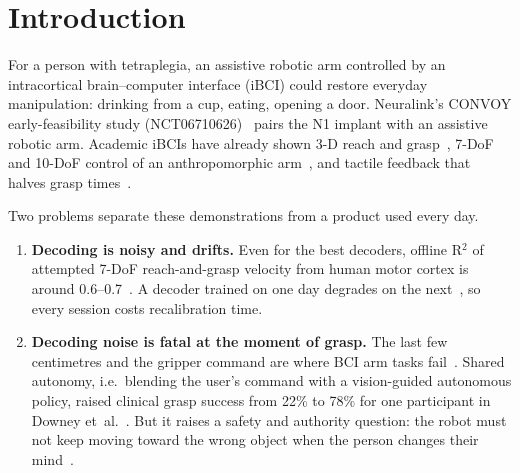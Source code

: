 \section{Introduction}
For a person with tetraplegia, an assistive robotic arm controlled by an intracortical
brain--computer interface (iBCI) could restore everyday manipulation: drinking from a
cup, eating, opening a door. Neuralink's CONVOY early-feasibility study
(NCT06710626)~\cite{neuralink2024convoy} pairs the N1 implant with an assistive robotic
arm. Academic iBCIs have already shown 3-D reach and grasp~\cite{hochberg2012reach},
7-DoF and 10-DoF control of an anthropomorphic arm~\cite{collinger2013high,wodlinger2015ten},
and tactile feedback that halves grasp times~\cite{flesher2021brain}.

Two problems separate these demonstrations from a product used every day.
\begin{enumerate}
\item \textbf{Decoding is noisy and drifts.} Even for the best decoders, offline R$^2$
  of attempted 7-DoF reach-and-grasp velocity from human motor cortex is around
  0.6--0.7~\cite{karpowicz2024falcon}. A decoder trained on one day degrades on the
  next~\cite{downey2018stability,jarosiewicz2015virtual,degenhart2020stabilization},
  so every session costs recalibration time.
\item \textbf{Decoding noise is fatal at the moment of grasp.} The last few centimetres
  and the gripper command are where BCI arm tasks fail~\cite{flesher2021brain,downey2016blending}.
  Shared autonomy, i.e.\ blending the user's command with a vision-guided autonomous
  policy, raised clinical grasp success from 22\% to 78\% for one participant in
  Downey et~al.~\cite{downey2016blending}. But it raises a safety and authority
  question: the robot must not keep moving toward the wrong object when the person
  changes their mind~\cite{dragan2013policy,javdani2015shared}.
\end{enumerate}

